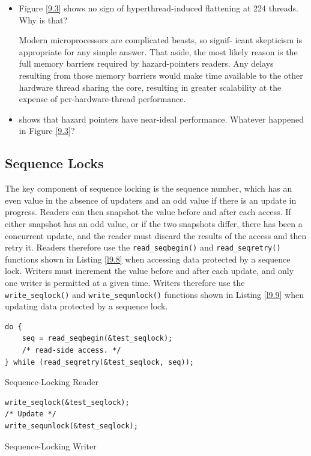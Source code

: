 \documentclass[11pt]{article}
\begin{document}
\begin{remark}[]
\begin{itemize}
\item Figure \ref{9.3} shows no sign of hyperthread-induced flattening at 224 threads. Why is that?

Modern microprocessors are complicated beasts, so signif- icant skepticism is appropriate for any
simple answer. That aside, the most likely reason is the full memory barriers required by
hazard-pointers readers. Any delays resulting from those memory barriers would make time available
to the other hardware thread sharing the core, resulting in greater scalability at the expense of
per-hardware-thread performance.
\item \cite{10.1145/2483852.2483867} shows that hazard pointers have near-ideal performance. Whatever
happened in Figure \ref{9.3}?
\end{itemize}
\end{remark}
\subsection{Sequence Locks}
\label{sec:org7468933}
\label{c9.4}
The key component of sequence locking is the sequence number, which has an even value in the absence
of updaters and an odd value if there is an update in progress. Readers can then snapshot the value
before and after each access. If either snapshot has an odd value, or if the two snapshots differ,
there has been a concurrent update, and the reader must discard the results of the access and then
retry it. Readers therefore use the \texttt{read\_seqbegin()} and \texttt{read\_seqretry()} functions shown in Listing \ref{l9.8}
when accessing data protected by a sequence lock. Writers must increment the value before and after
each update, and only one writer is permitted at a given time. Writers therefore use the
\texttt{write\_seqlock()} and \texttt{write\_sequnlock()} functions shown in Listing \ref{l9.9} when updating data protected
by a sequence lock.

\begin{listing}[htbp]
\begin{verbatim}
do {
    seq = read_seqbegin(&test_seqlock);
    /* read-side access. */
} while (read_seqretry(&test_seqlock, seq));
\end{verbatim}
\caption{\label{l9.8}Sequence-Locking Reader}
\end{listing}

\begin{listing}[htbp]
\begin{verbatim}
write_seqlock(&test_seqlock);
/* Update */
write_sequnlock(&test_seqlock);
\end{verbatim}
\caption{\label{l9.9}Sequence-Locking Writer}
\end{listing}
\end{document}
